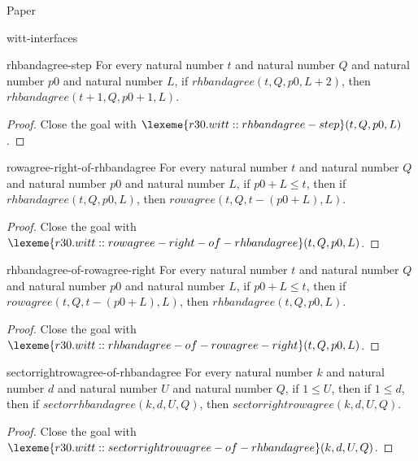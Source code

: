 \begin{lexlean}{Paper}
\begin{section}{witt-interfaces}
  \begin{theorem}{rhbandagree-step}
  For every natural number \(t\) and natural number \(Q\) and natural number \(p0\) and natural number \(L\), if \(rhbandagree(t, Q, p0, L + 2)\), then \(rhbandagree(t + 1, Q, p0 + 1, L)\).
  \begin{proof}
  Close the goal with \(\lexeme{r30.witt::rhbandagree-step}(t, Q, p0, L)\).
  \end{proof}
  \end{theorem}

  \begin{theorem}{rowagree-right-of-rhbandagree}
  For every natural number \(t\) and natural number \(Q\) and natural number \(p0\) and natural number \(L\), if \(p0 + L ≤ t\), then if \(rhbandagree(t, Q, p0, L)\), then \(rowagree(t, Q, t - (p0 + L), L)\).
  \begin{proof}
  Close the goal with \(\lexeme{r30.witt::rowagree-right-of-rhbandagree}(t, Q, p0, L)\).
  \end{proof}
  \end{theorem}

  \begin{theorem}{rhbandagree-of-rowagree-right}
  For every natural number \(t\) and natural number \(Q\) and natural number \(p0\) and natural number \(L\), if \(p0 + L ≤ t\), then if \(rowagree(t, Q, t - (p0 + L), L)\), then \(rhbandagree(t, Q, p0, L)\).
  \begin{proof}
  Close the goal with \(\lexeme{r30.witt::rhbandagree-of-rowagree-right}(t, Q, p0, L)\).
  \end{proof}
  \end{theorem}

  \begin{theorem}{sectorrightrowagree-of-rhbandagree}
  For every natural number \(k\) and natural number \(d\) and natural number \(U\) and natural number \(Q\), if \(1 ≤ U\), then if \(1 ≤ d\), then if \(sectorrhbandagree(k, d, U, Q)\), then \(sectorrightrowagree(k, d, U, Q)\).
  \begin{proof}
  Close the goal with \(\lexeme{r30.witt::sectorrightrowagree-of-rhbandagree}(k, d, U, Q)\).
  \end{proof}
  \end{theorem}


\end{section}
\end{lexlean}
